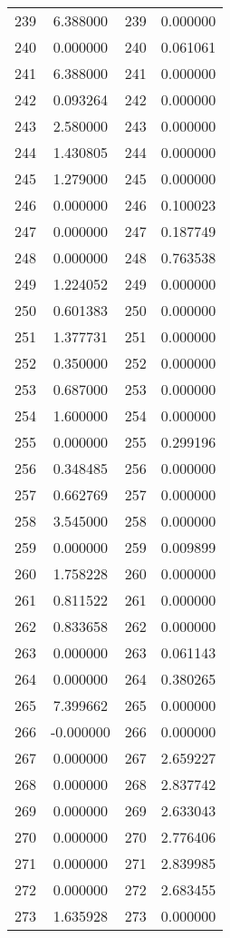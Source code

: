 \documentclass[12pt]{article}
\begin{document}
\begin{longtable}{@{}cccc@{}}
239 & 6.388000 & 239 & 0.000000 \\
240 & 0.000000 & 240 & 0.061061 \\
241 & 6.388000 & 241 & 0.000000 \\
242 & 0.093264 & 242 & 0.000000 \\
243 & 2.580000 & 243 & 0.000000 \\
244 & 1.430805 & 244 & 0.000000 \\
245 & 1.279000 & 245 & 0.000000 \\
246 & 0.000000 & 246 & 0.100023 \\
247 & 0.000000 & 247 & 0.187749 \\
248 & 0.000000 & 248 & 0.763538 \\
249 & 1.224052 & 249 & 0.000000 \\
250 & 0.601383 & 250 & 0.000000 \\
251 & 1.377731 & 251 & 0.000000 \\
252 & 0.350000 & 252 & 0.000000 \\
253 & 0.687000 & 253 & 0.000000 \\
254 & 1.600000 & 254 & 0.000000 \\
255 & 0.000000 & 255 & 0.299196 \\
256 & 0.348485 & 256 & 0.000000 \\
257 & 0.662769 & 257 & 0.000000 \\
258 & 3.545000 & 258 & 0.000000 \\
259 & 0.000000 & 259 & 0.009899 \\
260 & 1.758228 & 260 & 0.000000 \\
261 & 0.811522 & 261 & 0.000000 \\
262 & 0.833658 & 262 & 0.000000 \\
263 & 0.000000 & 263 & 0.061143 \\
264 & 0.000000 & 264 & 0.380265 \\
265 & 7.399662 & 265 & 0.000000 \\
266 & -0.000000 & 266 & 0.000000 \\
267 & 0.000000 & 267 & 2.659227 \\
268 & 0.000000 & 268 & 2.837742 \\
269 & 0.000000 & 269 & 2.633043 \\
270 & 0.000000 & 270 & 2.776406 \\
271 & 0.000000 & 271 & 2.839985 \\
272 & 0.000000 & 272 & 2.683455 \\
273 & 1.635928 & 273 & 0.000000 \\

\end{longtable}
\end{document}
